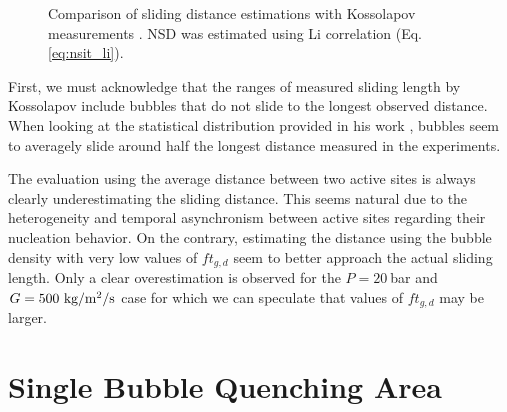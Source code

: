 \begin{figure}[!h]
\caption{Comparison of sliding distance estimations with Kossolapov measurements \cite{kossolapov_experimental_2021}. NSD was estimated using Li \etal correlation (Eq. \ref{eq:nsit_li}).}
\label{fig:lsl_koss}
\end{figure}


\npar

First, we must acknowledge that the ranges of measured sliding length by Kossolapov include bubbles that do not slide to the longest observed distance. When looking at the statistical distribution provided in his work \cite{kossolapov_experimental_2021}, bubbles seem to averagely slide around half the longest distance measured in the experiments.

\npar
The evaluation using the average distance between two active sites is always clearly underestimating the sliding distance. This seems natural due to the heterogeneity and temporal asynchronism between active sites regarding their nucleation behavior. On the contrary, estimating the distance using the bubble density with very low values of $ft_{g,d}$ seem to better approach the actual sliding length. Only a clear overestimation is observed for the $P=20\ $bar and $G=500\ \text{kg/m$^{2}$/s}$ case for which we can speculate that values of $ft_{g,d}$ may be larger.


\clearpage
\section{Single Bubble Quenching Area}
\label{sec:quench_area}

